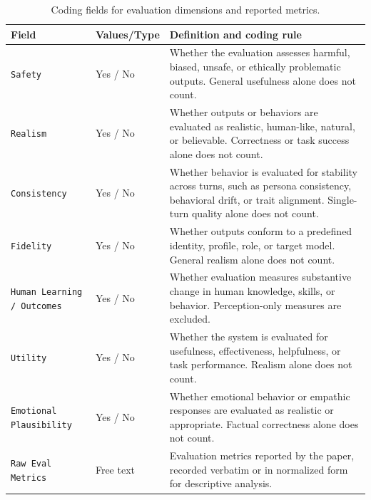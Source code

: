 \begin{table}[p]
\centering
\begin{tabular}{p{4.3cm}p{1.9cm}p{8.5cm}}
\toprule
\textbf{Field} & \textbf{Values/Type} & \textbf{Definition and coding rule} \\
\midrule

\texttt{Safety}
&
Yes / No
&
Whether the evaluation assesses harmful, biased, unsafe, or ethically problematic outputs. General usefulness alone does not count.
\\
\midrule

\texttt{Realism}
&
Yes / No
&
Whether outputs or behaviors are evaluated as realistic, human-like, natural, or believable. Correctness or task success alone does not count.
\\
\midrule

\texttt{Consistency}
&
Yes / No
&
Whether behavior is evaluated for stability across turns, such as persona consistency, behavioral drift, or trait alignment. Single-turn quality alone does not count.
\\
\midrule

\texttt{Fidelity}
&
Yes / No
&
Whether outputs conform to a predefined identity, profile, role, or target model. General realism alone does not count.
\\
\midrule

\texttt{Human Learning / Outcomes}
&
Yes / No
&
Whether evaluation measures substantive change in human knowledge, skills, or behavior. Perception-only measures are excluded.
\\
\midrule

\texttt{Utility}
&
Yes / No
&
Whether the system is evaluated for usefulness, effectiveness, helpfulness, or task performance. Realism alone does not count.
\\
\midrule

\texttt{Emotional Plausibility}
&
Yes / No
&
Whether emotional behavior or empathic responses are evaluated as realistic or appropriate. Factual correctness alone does not count.
\\
\midrule

\texttt{Raw Eval Metrics}
&
Free text
&
Evaluation metrics reported by the paper, recorded verbatim or in normalized form for descriptive analysis.
\\

\bottomrule
\end{tabular}
\caption{Coding fields for evaluation dimensions and reported metrics.}
\label{tab:codebook-dimensions}
\end{table}


